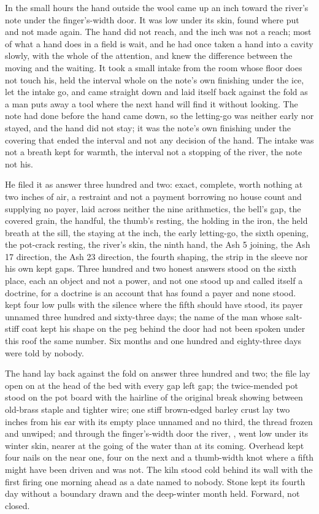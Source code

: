 In the small hours the hand outside the wool came up an inch toward the river's note under the finger's-width door. It was low under its skin, found where put and not made again. The hand did not reach, and the inch was not a reach; most of what a hand does in a field is wait, and he had once taken a hand into a cavity slowly, with the whole of the attention, and knew the difference between the moving and the waiting. It took a small intake from the room whose floor does not touch his, held the interval whole on the note's own finishing under the ice, let the intake go, and came straight down and laid itself back against the fold as a man puts away a tool where the next hand will find it without looking. The note had done before the hand came down, so the letting-go was neither early nor stayed, and the hand did not stay; it was the note's own finishing under the covering that ended the interval and not any decision of the hand. The intake was not a breath kept for warmth, the interval not a stopping of the river, the note not his.

He filed it as answer three hundred and two: exact, complete, worth nothing at two inches of air, a restraint and not a payment borrowing no house count and supplying no payer, laid across neither the nine arithmetics, the bell's gap, the covered grain, the handful, the thumb's resting, the holding in the iron, the held breath at the sill, the staying at the inch, the early letting-go, the sixth opening, the pot-crack resting, the river's skin, the ninth hand, the Ash 5 joining, the Ash 17 direction, the Ash 23 direction, the fourth shaping, the strip in the sleeve nor his own kept gaps. Three hundred and two honest answers stood on the sixth place, each an object and not a power, and not one stood up and called itself a doctrine, for a doctrine is an account that has found a payer and none stood.  kept four low pulls with the silence where the fifth should have stood, its payer unnamed three hundred and sixty-three days; the name of the man whose salt-stiff coat kept his shape on the peg behind the door had not been spoken under this roof the same number. Six months and one hundred and eighty-three days were told by nobody.

The hand lay back against the fold on answer three hundred and two; the file lay open on  at the head of the bed with every gap left gap; the twice-mended pot stood on the pot board with the hairline of the original break showing between old-brass staple and tighter wire; one stiff brown-edged barley crust lay two inches from his ear with its empty place unnamed and no third, the thread frozen and unwiped; and through the finger's-width door the river, , went low under its winter skin, nearer at the going of the water than at its coming. Overhead  kept four nails on the near one, four on the next and a thumb-width knot where a fifth might have been driven and was not. The kiln stood cold behind its wall with the first firing one morning ahead as a date named to nobody. Stone kept its fourth day without a boundary drawn and the deep-winter month held. Forward, not closed.
